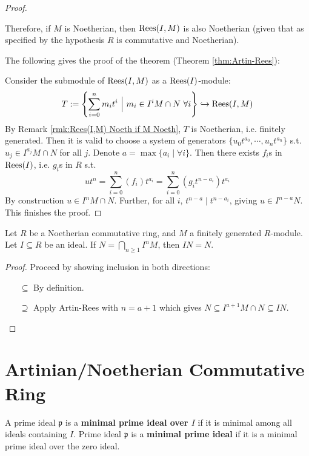 \begin{proof}
\begin{remark}
        Therefore, if $M$ is Noetherian, then $\mathrm{Rees}(I, M)$ is also Noetherian (given that as specified by the hypothesis $R$ is commutative and Noetherian).
    \end{remark}

    The following gives the proof of the theorem (Theorem \ref{thm:Artin-Rees}):

    Consider the submodule of $\mathrm{Rees}(I, M)$ as a $\mathrm{Rees}(I)$-module:
    \[
        T := \left\{ \sum\limits_{i=0}^n m_i t^i \ \Big|\  m_i\in I^i M\cap N\ \forall i \right\} \hookrightarrow \mathrm{Rees}(I, M)
    \]
    By Remark \ref{rmk:Rees(I,M) Noeth if M Noeth}, $T$ is Noetherian, i.e. finitely generated. Then it is valid to choose a system of generators $\{ u_0 t^{a_0}, \cdots, u_n t^{a_n} \}$ s.t. $u_j \in I^{a_j} M \cap N$ for all $j$. Denote $a = \max\{ a_i \mid \forall i \}$. Then there exists $f_i$s in $\mathrm{Rees}(I)$, i.e. $g_i$s in $R$ s.t.
    \[
        ut^n = \sum\limits_{i=0}^n (f_i) t^{a_i} = \sum\limits_{i=0}^n (g_i t^{n - a_i}) t^{a_i}
    \]
    By construction $u\in I^nM\cap N$. Further, for all $i$, $t^{n-a} \mid t^{n-a_i}$, giving $u\in I^{n-a}N$. This finishes the proof. 
\end{proof}

\begin{theorem}\label{thm:Krull's Intersection}
    Let $R$ be a Noetherian commutative ring, and $M$ a finitely generated $R$-module. Let $I\subseteq R$ be an ideal. If $N = \bigcap_{n\geq 1} I^n M$, then $IN = N$.
\end{theorem}

\begin{proof}
    Proceed by showing inclusion in both directions:
    \begin{itemize}
        \item[$\subseteq$] By definition.
        \item[$\supseteq$] Apply Artin-Rees with $n= a + 1$ which gives $N \subseteq I^{a+1}M \cap N \subseteq IN$.
    \end{itemize}
\end{proof}

\section{Artinian/Noetherian Commutative Ring}

\begin{definition}
    A prime ideal $\mathfrak{p}$ is a \textbf{minimal prime ideal over $I$} if it is minimal among all ideals containing $I$. Prime ideal $\mathfrak{p}$ is a \textbf{minimal prime ideal} if it is a minimal prime ideal over the zero ideal.
\end{definition}

